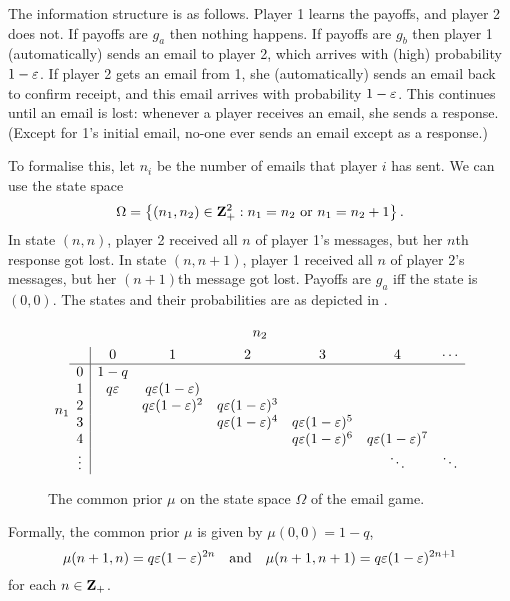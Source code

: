\documentclass[11pt,letterpaper,reqno,oneside]{article}
\begin{document}
The information structure is as follows. Player 1 learns the payoffs, and player 2 does not. If payoffs are $g_a$ then nothing happens. If payoffs are $g_b$ then player 1 (automatically) sends an email to player 2, which arrives with (high) probability $1-\varepsilon$. If player 2 gets an email from 1, she (automatically) sends an email back to confirm receipt, and this email arrives with probability $1-\varepsilon$. This continues until an email is lost: whenever a player receives an email, she sends a response. (Except for 1's initial email, no-one ever sends an email except as a response.)

To formalise this, let $n_i$ be the number of emails that player $i$ has sent. We can use the state space
%
\begin{equation*}
	\Omega = \left\{ (n_1,n_2) \in \mathbf{Z}_+^2 : \text{$n_1 = n_2$ or $n_1 = n_2 + 1$} \right\} .
\end{equation*}
%
In state $(n,n)$, player 2 received all $n$ of player 1's messages, but her $n$th response got lost. In state $(n,n+1)$, player 1 received all $n$ of player 2's messages, but her $(n+1)$th message got lost. Payoffs are $g_a$ iff the state is $(0,0)$. The states and their probabilities are as depicted in .
%
\begin{figure}
	\begin{gather*}
		n_2\\n_1
		\begin{array}{c|ccccccc}
					& 0			& 1					& 2					& 3					& 4					& \cdots	\\ \hline
			0		& 1-q		& 					& 					& 					& 					& 			\\
			1		& q \varepsilon	& q \varepsilon(1-\varepsilon)	& 					& 					& 					& 			\\
			2		& 			& q \varepsilon(1-\varepsilon)^2	& q \varepsilon(1-\varepsilon)^3	& 					& 					& 			\\
			3		& 			& 					& q \varepsilon(1-\varepsilon)^4	& q \varepsilon(1-\varepsilon)^5	& 					& 			\\
			4		& 			& 					& 					& q \varepsilon(1-\varepsilon)^6	& q \varepsilon(1-\varepsilon)^7	& 			\\
			\vdots	& 			& 					& 					& 					& \ddots			& \ddots
		\end{array}
	\end{gather*}
	\caption{The common prior $\mu$ on the state space $\Omega$ of the email game.}
	\label{fig:email_game_argument}
\end{figure}
%
Formally, the common prior $\mu$ is given by $\mu(0,0) = 1-q$,
%
\begin{equation*}
	\mu(n+1,n) = q \varepsilon (1-\varepsilon)^{2n} 
	\quad\text{and}\quad
	\mu(n+1,n+1) = q \varepsilon (1-\varepsilon)^{2n+1}
\end{equation*}
%
for each $n \in \mathbf{Z}_+$.
\end{document}
